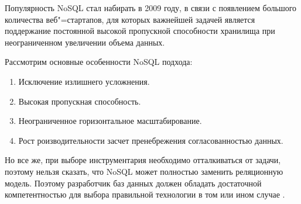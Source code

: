 Популярность NoSQL стал набирать в 2009 году, в связи с появлением большого количества веб"=стартапов, для которых важнейшей задачей является поддержание постоянной высокой пропускной способности хранилища при неограниченном увеличении объема
данных. 

Рассмотрим основные особенности NoSQL подхода:

\begin{enumerate}
    \item Исключение излишнего усложнения. 
    \item Высокая пропускная способность. 
    \item Неограниченное горизонтальное масштабирование. 
    \item Рост роизводительности засчет пренебрежения согласованностью данных.
\end{enumerate}

Но все же, при выборе инструментария необходимо отталкиваться от задачи, поэтому нельзя сказать, что NoSQL может полностью заменить реляционную модель. Поэтому разработчик баз данных должен обладать достаточной компетентностью для выбора правильной технологии в том или ином случае \cite{9}.